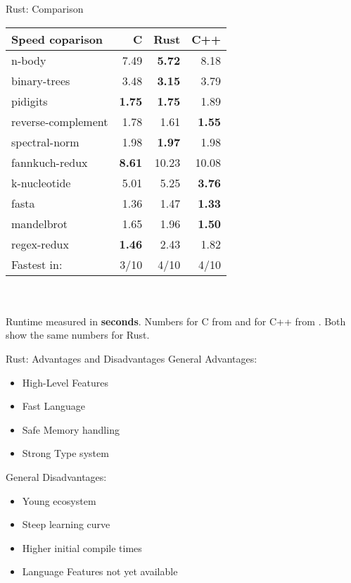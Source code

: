 \begin{frame}[c]{Rust: Comparison}
    \normalsize
    \vfill
    \begin{tabular}{lrrr}
        \textbf{Speed coparison} & C & Rust & C++ \\ \hline
        n-body & 7.49 & \textbf{5.72} & 8.18 \\
        binary-trees & 3.48 & \textbf{3.15} & 3.79 \\
        pidigits & \textbf{1.75} & \textbf{1.75} & 1.89 \\
        reverse-complement & 1.78 & 1.61 & \textbf{1.55} \\
        spectral-norm & 1.98 & \textbf{1.97} & 1.98 \\
        fannkuch-redux & \textbf{8.61} & 10.23 & 10.08 \\
        k-nucleotide & 5.01 & 5.25 & \textbf{3.76} \\
        fasta & 1.36 & 1.47 & \textbf{1.33} \\
        mandelbrot & 1.65 & 1.96 & \textbf{1.50} \\
        regex-redux & \textbf{1.46} & 2.43 & 1.82 \\ \hline
        Fastest in: & 3/10 & 4/10 & 4/10 \\
    \end{tabular} \\ \\
    \footnotesize
    Runtime measured in \textbf{seconds}. Numbers for C from \cite{benchc} and for C++ from
    \cite{benchcpp}. Both show the same numbers for Rust.

\end{frame}



\begin{frame}[c]{Rust: Advantages and Disadvantages}
    General Advantages:
    \begin{itemize}[<+(1)->]
        \item High-Level Features
        \item Fast Language
        \item Safe Memory handling
        \item Strong Type system
    \end{itemize}
    \pause
    General Disadvantages:
    \begin{itemize}[<+(1)->]
        \item Young ecosystem
        \item Steep learning curve
        \item Higher initial compile times
        \item Language Features not yet available
    \end{itemize}
\end{frame}


